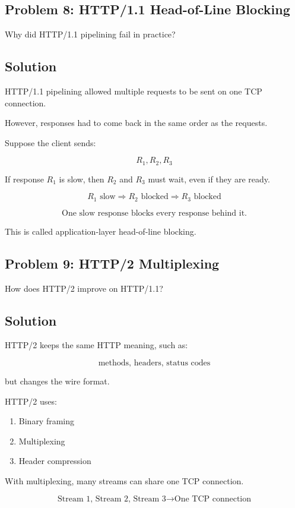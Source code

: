 \documentclass[12pt]{article}
\begin{document}
\subsection*{Problem 8: HTTP/1.1 Head-of-Line Blocking}
Why did HTTP/1.1 pipelining fail in practice?

\subsection*{Solution}
HTTP/1.1 pipelining allowed multiple requests to be sent on one TCP connection.

However, responses had to come back in the same order as the requests.

Suppose the client sends:

\[
R_1, R_2, R_3
\]

If response \(R_1\) is slow, then \(R_2\) and \(R_3\) must wait, even if they are ready.

\[
R_1 \text{ slow} \Rightarrow R_2 \text{ blocked} \Rightarrow R_3 \text{ blocked}
\]

\[
\boxed{\text{One slow response blocks every response behind it.}}
\]

This is called application-layer head-of-line blocking.

\subsection*{Problem 9: HTTP/2 Multiplexing}
How does HTTP/2 improve on HTTP/1.1?

\subsection*{Solution}
HTTP/2 keeps the same HTTP meaning, such as:

\[
\text{methods, headers, status codes}
\]

but changes the wire format.

HTTP/2 uses:

\begin{enumerate}
    \item Binary framing
    \item Multiplexing
    \item Header compression
\end{enumerate}

With multiplexing, many streams can share one TCP connection.

\[
\text{Stream 1, Stream 2, Stream 3} \rightarrow \text{One TCP connection}
\]
\end{document}
